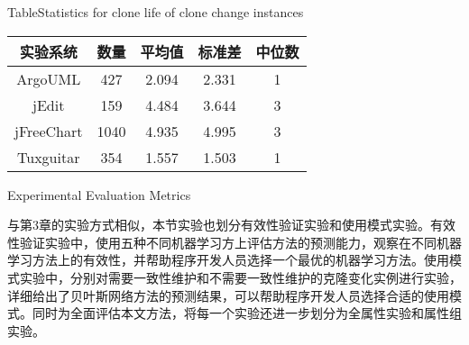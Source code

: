 \begin{table}[htbp]
{Table$\!$}{Statistics for clone life of clone change instances}
\vspace{0.5em}
\centering
\wuhao
\begin{tabular}{ccccc}
\toprule[1.5pt]
{实验系统}&{数量}&{平均值}&{标准差}&{中位数}\\ 
\midrule[1pt]
ArgoUML&427&2.094&2.331&1\\ 
jEdit&159&4.484&3.644&3\\ 
jFreeChart&1040&4.935&4.995&3\\ 
Tuxguitar&354&1.557&1.503&1\\ 
\bottomrule[1.5pt]
\end{tabular}
\end{table}



{Experimental Evaluation Metrics}
\label{ref-changingmetrics}

与第3章的实验方式相似，本节实验也划分有效性验证实验和使用模式实验。有效性验证实验中，使用五种不同机器学习方上评估方法的预测能力，观察在不同机器学习方法上的有效性，并帮助程序开发人员选择一个最优的机器学习方法。使用模式实验中，分别对需要一致性维护和不需要一致性维护的克隆变化实例进行实验，详细给出了贝叶斯网络方法的预测结果，可以帮助程序开发人员选择合适的使用模式。同时为全面评估本文方法，将每一个实验还进一步划分为全属性实验和属性组实验。

